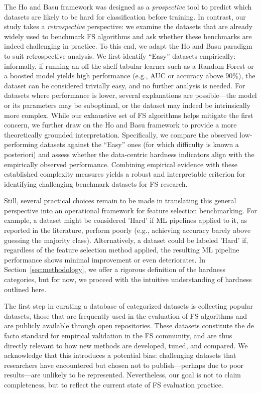 \documentclass[preprint,12pt,authoryear]{elsarticle}
\begin{document}
The Ho and Basu framework was designed as a \emph{prospective} tool to predict which datasets are likely to be hard for classification before training. In contrast, our study takes a \emph{retrospective} perspective: we examine the datasets that are already widely used to benchmark FS algorithms and ask whether these benchmarks are indeed challenging in practice. To this end, we adapt the Ho and Basu paradigm to suit retrospective analysis. We first identify ``Easy'' datasets empirically: informally, if running an off-the-shelf tabular learner such as a Random Forest or a boosted model yields high performance (e.g., AUC or accuracy above $90\%$), the dataset can be considered trivially easy, and no further analysis is needed. For datasets where performance is lower, several explanations are possible---the model or its parameters may be suboptimal, or the dataset may indeed be intrinsically more complex. While our exhaustive set of FS algorithms helps mitigate the first concern, we further draw on the Ho and Basu framework to provide a more theoretically grounded interpretation. Specifically, we compare the observed low-performing datasets against the ``Easy'' ones (for which difficulty is known a posteriori) and assess whether the data-centric hardness indicators align with the empirically observed performance. Combining empirical evidence with these established complexity measures yields a robust and interpretable criterion for identifying challenging benchmark datasets for FS research.



Still, several practical choices remain to be made in translating this general perspective into an operational framework for feature selection benchmarking. For example, a dataset might be considered 'Hard' if ML pipelines applied to it, as reported in the literature, perform poorly (e.g., achieving accuracy barely above guessing the majority class). Alternatively, a dataset could be labeled 'Hard' if, regardless of the feature selection method applied, the resulting ML pipeline performance shows minimal improvement or even deteriorates. In Section~\ref{sec:methodology}, we offer a rigorous definition of the hardness categories, but for now, we proceed with the intuitive understanding of hardness outlined here.


The first step in curating a database of categorized datasets is collecting popular datasets, those that are frequently used in the evaluation of FS algorithms and are publicly available through open repositories. These datasets constitute the de facto standard for empirical validation in the FS community, and are thus directly relevant to how new methods are developed, tuned, and compared. We acknowledge that this introduces a potential bias: challenging datasets that researchers have encountered but chosen not to publish—perhaps due to poor results—are unlikely to be represented. Nevertheless, our goal is not to claim completeness, but to reflect the current state of FS evaluation practice. 
\end{document}
